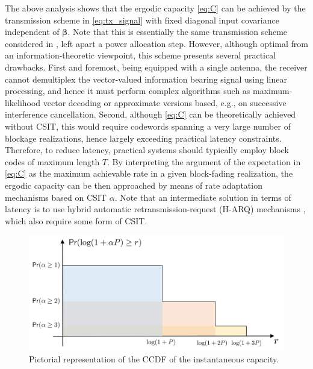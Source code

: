 \documentclass[10pt,journal,a4paper]{IEEEtran}
\renewcommand{\vec}[1]{\bm{#1}}		%
\begin{document}
The above analysis shows that the ergodic capacity \eqref{eq:C} can be achieved by the transmission scheme in \eqref{eq:tx_signal} with fixed diagonal input covariance independent of $\vec{\beta}$. Note that this is essentially the same transmission scheme considered in \cite{fettweis2020network}, left apart a power allocation step. However, although optimal from an information-theoretic viewpoint, this scheme presents several practical drawbacks. First and foremost, being equipped with a single antenna, the receiver cannot demultiplex the vector-valued information bearing signal using linear processing, and hence it must perform complex algorithms such as maximum-likelihood vector decoding or approximate versions based, e.g., on successive interference cancellation. Second, although \eqref{eq:C} can be theoretically achieved without CSIT, this would require codewords spanning a very large number of blockage realizations, hence largely exceeding practical latency constraints. Therefore, to reduce latency, practical systems should typically employ block codes of maximum length $T$. By interpreting the argument of the expectation in \eqref{eq:C} as the maximum achievable rate in a given block-fading realization, the ergodic capacity can be then approached by means of rate adaptation mechanisms based on CSIT $\alpha$. Note that an intermediate solution in terms of latency is to use hybrid automatic retransmission-request (H-ARQ) mechanisms \cite{sesia2004incremental}, which also require some form of CSIT. 

\begin{figure}[ht!]
\centering
\includegraphics[width=1\linewidth]{ccdf}
\caption{Pictorial representation of the CCDF of the instantaneous capacity.}
\label{fig:ccdf}
\end{figure}
\end{document}
